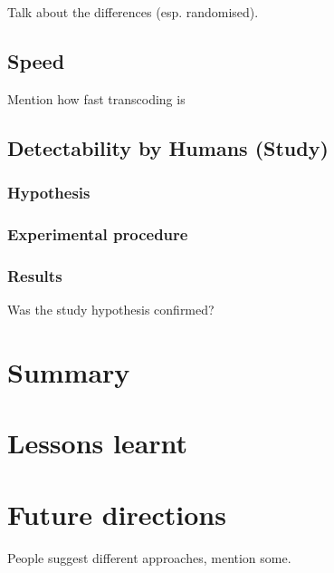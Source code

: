 \documentclass[12pt,british,twoside,notitlepage,usenames,dvipsnames,hypens,final]{report}
\numberwithin{equation}{section}
\numberwithin{figure}{section}
\begin{document}
Talk about the differences (esp. randomised).

\subsection{Speed}

Mention how fast transcoding is

\subsection{Detectability by Humans (Study)}

\subsubsection{Hypothesis}

\subsubsection{Experimental procedure}

\subsubsection{Results}

Was the study hypothesis confirmed?



\section{Summary}

\section{Lessons learnt}

\section{Future directions}

People suggest different approaches, mention some.
\end{document}
